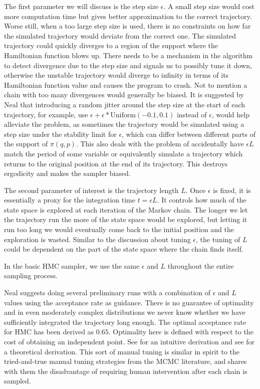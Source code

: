 \documentclass[12pt]{report}
\begin{document}
The first parameter we will discuss is the step size $\epsilon$. A small step size would cost more computation time but gives better approximation to the correct trajectory. Worse still, when a too large step size is used, there is no constraints on how far the simulated trajectory would deviate from the correct one. The simulated trajectory could quickly diverges to a region of the support where the Hamiltonian function blows up. There needs to be a mechanism in the algorithm to detect divergence due to the step size and signals us to possibly tune it down, otherwise the unstable trajectory would diverge to infinity in terms of its Hamiltonian function value and causes the program to crash. Not to mention a chain with too many divergences would generally be biased. It is suggested by Neal that introducing a random jitter around the step size at the start of each trajectory, for example, use $\epsilon + \epsilon*\text{Uniform}(-0.1,0.1)$ instead of $\epsilon$,  would help alleviate the problem, as sometimes the trajectory would be simulated using a step size under the stability limit for $\epsilon$, which can differ between different parts of the support of $\pi(q,p)$. This also deals with the problem of accidentally have $\epsilon L$ match the period of some variable or equivalently simulate a trajectory which returns to the original position at the end of its trajectory. This destroys ergodicity and makes the sampler biased. 

The second parameter of interest is the trajectory length $L$. Once $\epsilon$ is fixed, it is essentially a proxy for the integration time $t= \epsilon L$. It controls how much of the state space is explored at each iteration of the Markov chain. The longer we let the trajectory run the more of the state space would be explored, but letting it run too long we would eventually come back to the initial position and the exploration is wasted. Similar to the discussion about tuning $\epsilon$, the tuning of $L$ could be dependent on the part of the state space where the chain finds itself.

In the basic HMC sampler, we use the same $\epsilon$ and $L$ throughout the
entire sampling process.  

Neal \cite{neal1996sampling} suggests doing several preliminary runs with a combination of $\epsilon$ and $L$ values using the acceptance rate as guidance. There is no guarantee of optimality and in even moderately complex distributions we never know whether we have sufficiently integrated the trajectory long enough. The optimal acceptance rate for HMC has been derived as $0.65$. Optimality here is defined with respect to the cost of obtaining an independent point. See \cite{neal2011mcmc} for an intuitive derivation and see \cite{beskos2013optimal} for a theoretical derivation. This sort of manual tuning is similar in spirit to the tried-and-true manual tuning strategies from the MCMC literature, and shares with them the disadvantage of requiring human intervention after each chain is sampled. 
\end{document}
